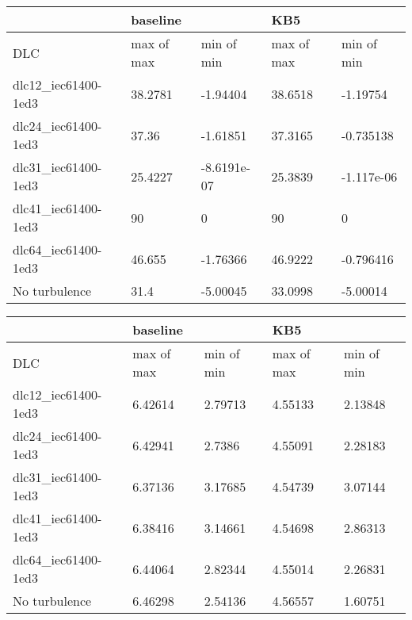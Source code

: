 \begin{tabular}{lllll}
\toprule
                     & \multicolumn{2}{l}{baseline} &         KB5 &\\
\midrule
                 DLC &  max of max &  min of min &  max of max &  min of min \\
 dlc12\_iec61400-1ed3 &     38.2781 &    -1.94404 &     38.6518 &    -1.19754 \\
 dlc24\_iec61400-1ed3 &       37.36 &    -1.61851 &     37.3165 &   -0.735138 \\
 dlc31\_iec61400-1ed3 &     25.4227 & -8.6191e-07 &     25.3839 &  -1.117e-06 \\
 dlc41\_iec61400-1ed3 &          90 &           0 &          90 &           0 \\
 dlc64\_iec61400-1ed3 &      46.655 &    -1.76366 &     46.9222 &   -0.796416 \\
    No turbulence &        31.4 &    -5.00045 &     33.0998 &    -5.00014 \\
\bottomrule
\end{tabular}


\begin{tabular}{lllll}
\toprule
                     & \multicolumn{2}{l}{baseline} &         KB5 &\\
\midrule
                 DLC &  max of max &  min of min &  max of max &  min of min \\
 dlc12\_iec61400-1ed3 &     6.42614 &     2.79713 &     4.55133 &     2.13848 \\
 dlc24\_iec61400-1ed3 &     6.42941 &      2.7386 &     4.55091 &     2.28183 \\
 dlc31\_iec61400-1ed3 &     6.37136 &     3.17685 &     4.54739 &     3.07144 \\
 dlc41\_iec61400-1ed3 &     6.38416 &     3.14661 &     4.54698 &     2.86313 \\
 dlc64\_iec61400-1ed3 &     6.44064 &     2.82344 &     4.55014 &     2.26831 \\
    No turbulence &     6.46298 &     2.54136 &     4.56557 &     1.60751 \\
\bottomrule
\end{tabular}


